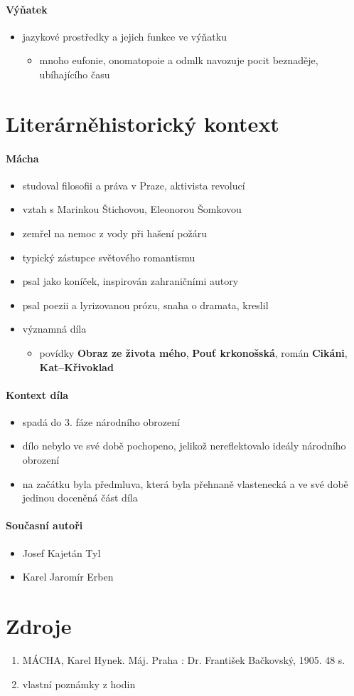 \documentclass[10pt,a4paper]{article}
\begin{document}
\paragraph{Výňatek}
\begin{itemize}
\item jazykové prostředky a jejich funkce ve výňatku
	\begin{itemize}
	\item mnoho eufonie, onomatopoie a odmlk navozuje pocit beznaděje, ubíhajícího času
	\end{itemize}
\end{itemize}
\section*{Literárněhistorický kontext}
\paragraph{Mácha}
\begin{itemize}
\item studoval filosofii a práva v Praze, aktivista revolucí
\item vztah s Marinkou Štichovou, Eleonorou Šomkovou
\item zemřel na nemoc z vody při hašení požáru
\item typický zástupce světového romantismu
\item psal jako koníček, inspirován zahraničními autory
\item psal poezii a lyrizovanou prózu, snaha o dramata, kreslil\\
\item významná díla
	\begin{itemize}
	\item povídky \textbf{Obraz ze života mého}, \textbf{Pouť krkonošská}, román \textbf{Cikáni}, \textbf{Kat--Křivoklad}
	\end{itemize}
\end{itemize}

\paragraph{Kontext díla}
\begin{itemize}
\item spadá do 3. fáze národního obrození
\item dílo nebylo ve své době pochopeno, jelikož nereflektovalo ideály národního obrození
\item na začátku byla předmluva, která byla přehnaně vlastenecká a ve své době jedinou doceněná část díla
\end{itemize}

\paragraph{Současní autoři}
\begin{itemize}
\item Josef Kajetán Tyl
\item Karel Jaromír Erben
\end{itemize}
\section*{Zdroje}
\begin{enumerate}
\item MÁCHA, Karel Hynek. Máj. Praha : Dr. František Bačkovský, 1905. 48 s.
\item vlastní poznámky z hodin 
\end{enumerate}
\end{document}
